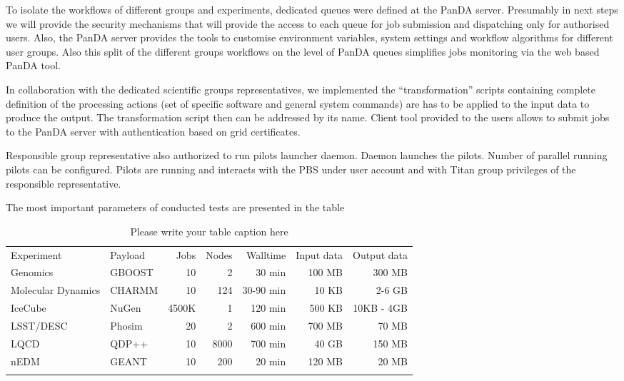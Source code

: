 To isolate the workflows of different groups and experiments, dedicated queues
were defined at the PanDA server. Presumably in  next steps we will provide the
security mechanisms that will provide the access to each queue for job
submission and dispatching only for authorised users. Also, the PanDA server
provides the tools to customise environment variables, system settings and
workflow algorithms for different user groups. Also this split of the different
groups workflows on the level of PanDA queues simplifies jobs monitoring via
the web based PanDA tool. 

In collaboration with the dedicated scientific groups representatives, we
implemented the ``transformation'' scripts containing complete definition of
the processing actions (set of specific software and general system commands)
are has to be applied to the input data to produce the output. The
transformation script then can be addressed by its name. Client tool provided
to the users allows to submit jobs to the PanDA server with authentication
based on grid certificates. 

Responsible group representative also authorized to run pilots launcher daemon.
Daemon launches the pilots. Number of parallel running pilots can be
configured. Pilots are running and interacts with the PBS under user account
and with Titan group privileges of the responsible representative.

The most important parameters of conducted tests are presented in the table

\begin{table}
\caption{Please write your table caption here}
\label{tab:beyondhep}       %
\begin{tabular}{llrrrrr}
\hline\noalign{\smallskip}
Experiment & Payload & Jobs & Nodes & Walltime & Input data & Output data \\
\noalign{\smallskip}\hline\noalign{\smallskip}
Genomics           & GBOOST & 10    & 2    & 30 min    & 100 MB & 300 MB \\
Molecular Dynamics & CHARMM & 10    & 124  & 30-90 min & 10 KB  & 2-6 GB \\
IceCube            & NuGen  & 4500K & 1    & 120 min   & 500 KB & 10KB - 4GB \\
LSST/DESC          & Phosim & 20    & 2    & 600 min   & 700 MB & 70 MB \\
LQCD               & QDP++  & 10    & 8000 & 700 min   & 40 GB  & 150 MB \\
nEDM               & GEANT  & 10    & 200  & 20 min    & 120 MB & 20 MB \\
\noalign{\smallskip}\hline
\end{tabular}
\end{table}


